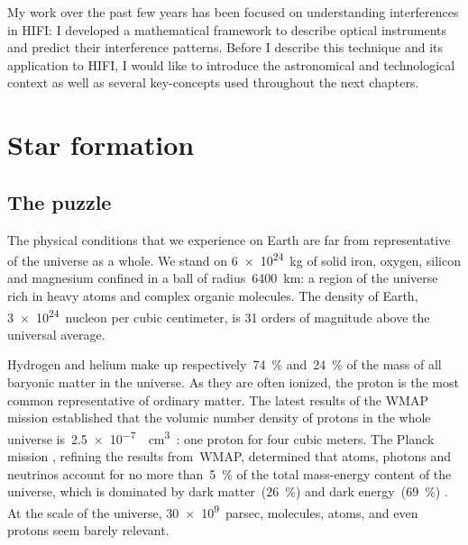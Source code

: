 My work over the past few years has been focused on understanding interferences in HIFI:
I developed a mathematical framework to describe optical instruments and predict their interference patterns.
Before I describe this technique and its application to HIFI,
I would like to introduce the astronomical and technological context as well as several key-concepts used throughout the next chapters.



\section{Star formation}

\subsection{The puzzle}

The physical conditions that we experience on Earth are far from representative of the universe as a whole.
We stand on \SI{6e24}{\kilo\gram} of solid iron, oxygen, silicon and magnesium confined in a ball of radius~\SI{6400}{\km}:
a region of the universe rich in heavy atoms and complex organic molecules.
The density of Earth, \SI{3e24}{nucleon} per cubic centimeter, is 31 orders of magnitude above the universal average.

Hydrogen and helium make up respectively~\SI{74}{\percent} and~\SI{24}{\percent} of the mass of all baryonic matter in the universe.
As they are often ionized, the proton is the most common representative of ordinary matter.
The latest results of the WMAP mission %
established that the volumic number density of protons in the whole universe is~\SI{2.5e-7}{\per\centi\meter\cubed}~\parencite{bennett2013nine}: one proton for four cubic meters.
The Planck mission%
, refining the results from~WMAP, determined that atoms, photons and neutrinos account for no more than~\SI{5}{\percent} of the total mass-energy content of the universe, which is dominated by dark matter~(\SI{26}{\percent}) and dark energy~(\SI{69}{\percent}) \parencite{ade2014planck}.
At the scale of the universe, \SI{30e9}{parsec}, molecules, atoms, and even protons seem barely relevant.

